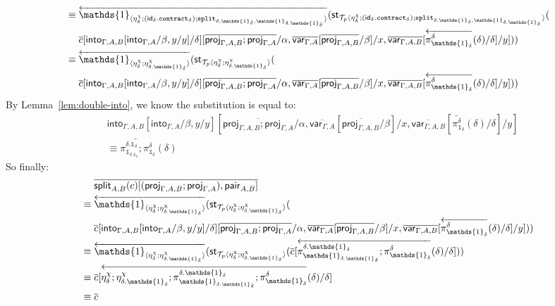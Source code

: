 \documentclass[10pt]{article}
\theoremstyle{definition}
\newcommand{\id}{\mathsf{id}}
\newcommand{\rewrite}[2]{\overleftarrow{#1}(#2)}
\newcommand\StI[2]{\ensuremath{\mathsf{st}_{#1}(#2)}}
\newcommand\ApEl[2]{\mathcal{T}_{#1}\langle#2\rangle}
\newcommand\bdot[0]{\mathbin{.}}
\newcommand{\upstairs}[1]{\overline{#1}}
\newcommand\proj[1]{\ensuremath{\mathsf{proj}_{#1}}}
\newcommand\qvar[1]{\ensuremath{\mathsf{var}_{#1}}}
\newcommand\into[1]{\ensuremath{\mathsf{into}_{#1}}}
\newcommand\One{\ensuremath{\mathds{1}}}
\newcommand\ApOne[1]{\ensuremath{\One_{\langle {#1} \rangle }}}
\newcommand\contract[1]{\ensuremath{\mathtt{contract}_{#1}}}
\newcommand\tsplit[1]{\ensuremath{\mathtt{split}_{#1}}}
\newcommand\qpair[1]{\ensuremath{\mathsf{pair}_{#1}}}
\newcommand\qsplit[1]{\ensuremath{\mathsf{split}_{#1}}}
\begin{document}
\begin{enumerate}[style = multiline, labelwidth = 80pt]
\begin{align*}
\equiv{} &\rewrite{\ApOne{\eta^\chi_\delta;(\id_\delta \bdot \contract{\delta});\tsplit{\delta,\One_\delta,\One_{\delta.\One_\delta}}}}{\StI{\ApEl{p}{\eta^\chi_\delta;(\id_\delta \bdot \contract{\delta});\tsplit{\delta,\One_\delta,\One_{\delta.\One_\delta}}}}{\\&\upstairs{c}[\into{\Gamma, A, B}[\into{\Gamma, A}/\beta, y/y] /\delta][\upstairs{\proj{\Gamma, A, B};\proj{\Gamma, A}}/\alpha, \upstairs{\qvar{\Gamma, A}}[\upstairs{\proj{\Gamma, A, B}}/\beta]/x, \upstairs{\qvar{\Gamma, A, B}}[\rewrite{\pi^\delta_{\One_\delta}}{\delta}/\delta]/y]}} \\
\equiv{} &\rewrite{\ApOne{\eta^\chi_\delta;\eta^\chi_{\delta.\One_\delta}}}{\StI{\ApEl{p}{\eta^\chi_\delta;\eta^\chi_{\delta.\One_\delta}}}{\\&\upstairs{c}[\into{\Gamma, A, B}[\into{\Gamma, A}/\beta, y/y] /\delta][\upstairs{\proj{\Gamma, A, B};\proj{\Gamma, A}}/\alpha, \upstairs{\qvar{\Gamma, A}}[\upstairs{\proj{\Gamma, A, B}}/\beta]/x, \upstairs{\qvar{\Gamma, A, B}}[\rewrite{\pi^\delta_{\One_\delta}}{\delta}/\delta]/y]}}
\end{align*}
By Lemma~\ref{lem:double-into}, we know the substitution is equal to:
\begin{align*}
&\into{\Gamma, A, B}[\into{\Gamma, A}/\beta, y/y][\upstairs{\proj{\Gamma, A, B};\proj{\Gamma, A}}/\alpha, \upstairs{\qvar{\Gamma, A}}[\upstairs{\proj{\Gamma, A, B}}/\beta]/x, \upstairs{\qvar{\Gamma, A, B}}[\rewrite{\pi^\delta_{\One_\delta}}{\delta}/\delta]/y] \\
&\equiv \rewrite{\pi^{\delta.\One_\delta}_{\One_{\delta.\One_\delta}};\pi^{\delta}_{\One_{\delta}}}{\delta}
\end{align*}
So finally:
\begin{align*}
&\upstairs{\qsplit{A,B}(c)[(\proj{\Gamma, A, B};\proj{\Gamma, A}), \allowbreak\qpair{A,B}]} \\
\equiv{} &\rewrite{\ApOne{\eta^\chi_\delta;\eta^\chi_{\delta.\One_\delta}}}{\StI{\ApEl{p}{\eta^\chi_\delta;\eta^\chi_{\delta.\One_\delta}}}{\\&\upstairs{c}[\into{\Gamma, A, B}[\into{\Gamma, A}/\beta, y/y] /\delta][\upstairs{\proj{\Gamma, A, B};\proj{\Gamma, A}}/\alpha, \upstairs{\qvar{\Gamma, A}}[\upstairs{\proj{\Gamma, A, B}}/\beta]/x, \upstairs{\qvar{\Gamma, A, B}}[\rewrite{\pi^\delta_{\One_\delta}}{\delta}/\delta]/y]}} \\
\equiv{} &\rewrite{\ApOne{\eta^\chi_\delta;\eta^\chi_{\delta.\One_\delta}}}{\StI{\ApEl{p}{\eta^\chi_\delta;\eta^\chi_{\delta.\One_\delta}}}{\upstairs{c}[\rewrite{\pi^{\delta.\One_\delta}_{\One_{\delta.\One_\delta}};\pi^{\delta}_{\One_{\delta}}}{\delta}/\delta]}} \\
\equiv{} &\upstairs{c}[\rewrite{\eta^\chi_\delta;\eta^\chi_{\delta.\One_\delta};\pi^{\delta.\One_\delta}_{\One_{\delta.\One_\delta}};\pi^{\delta}_{\One_{\delta}}}{\delta}/\delta]\\
\equiv{} &\upstairs{c}
\end{align*}


\end{enumerate}
\end{document}
